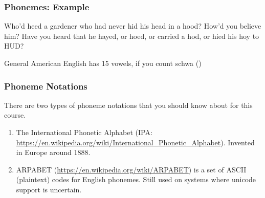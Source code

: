 \documentclass{beamer}
\newcommand{\ipa}[1]{\textipa{#1}}
\begin{document}
\begin{frame}
  \frametitle{Phonemes: Example}

  \begin{block}{}
    Who'd heed a gardener who had never hid his head in a hood?  How'd
    you believe him?  Have you heard that he hayed, or hoed, or
    carried a hod, or hied his hoy to HUD?
  \end{block}
  \begin{block}{General American English has 15 vowels, if you count schwa (\ipa{[@]})}
  \end{block}
\end{frame}

\begin{frame}
  \frametitle{Phoneme Notations}

  There are two types of phoneme notations that you should know about
  for this course.
  \begin{enumerate}
  \item The International Phonetic Alphabet (IPA:
    \url{https://en.wikipedia.org/wiki/International_Phonetic_Alphabet}).
    Invented in Europe around 1888.
  \item ARPABET (\url{https://en.wikipedia.org/wiki/ARPABET}) is a
    set of ASCII (plaintext) codes for English phonemes.  Still used
    on systems where unicode support is uncertain.
  \end{enumerate}
\end{frame}
\end{document}

